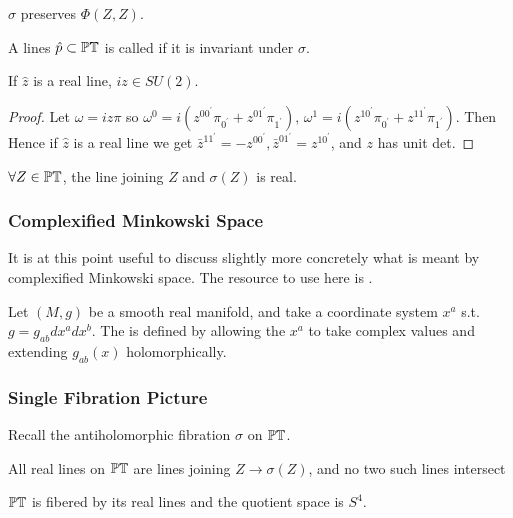 \documentclass{article}
\begin{document}
\begin{lemma}
	$\sigma$ preserves $\Phi(Z,Z)$. 
\end{lemma}

\begin{definition}
	A lines $\hat{p}\subset \mathbb{PT}$ is called  if it is invariant under $\sigma$. 
\end{definition}

\begin{lemma}
	If $\hat{z}$ is a real line, $iz \in SU(2)$. 
\end{lemma}
\begin{proof}
	Let $\omega = iz\pi$ so $\omega^0 = i(z^{00^\prime}\pi_{0^\prime}+z^{01^\prime}\pi_{1^\prime}), \, \omega^1 = i(z^{10^\prime}\pi_{0^\prime}+z^{11^\prime}\pi_{1^\prime})$. Then 
Hence if $\hat{z}$ is a real line we get $\bar{z}^{11^\prime} = -z^{00^\prime}, \bar{z}^{01^\prime}=z^{10^\prime}$, and $z$ has unit det. 
\end{proof}

\begin{lemma}
	$\forall Z \in \mathbb{PT}$, the line joining $Z$ and $\sigma(Z)$ is real. 
\end{lemma}
\subsubsection{Complexified Minkowski Space}
It is at this point useful to discuss slightly more concretely what is meant by complexified Minkowski space. The resource to use here is \cite{Adamo2018}. 
\begin{definition}
	Let $(M,g)$ be a smooth real manifold, and take a coordinate system $x^a$ s.t. $g= g_{ab} dx^a dx^b$. The  is defined by allowing the $x^a$ to take complex values and extending $g_{ab}(x)$ holomorphically.  
\end{definition}
\subsubsection{Single Fibration Picture}
Recall the antiholomorphic fibration $\sigma$ on $\mathbb{PT}$. 
\begin{prop}
	All real lines on $\mathbb{PT}$ are lines joining $Z \to \sigma(Z)$, and no two such lines intersect
\end{prop}
\begin{prop}
	$\mathbb{PT}$ is fibered by its real lines and the quotient space is $S^4$. 
\end{prop}
\end{document}
